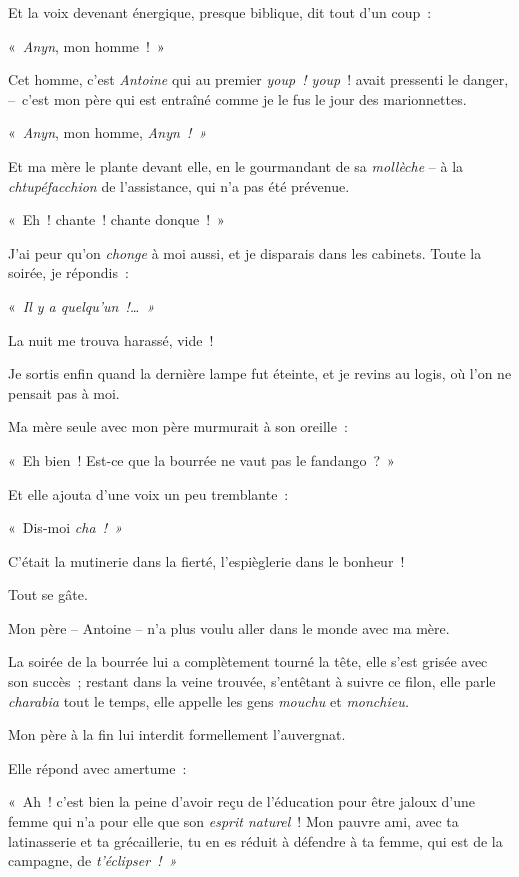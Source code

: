 \documentclass[french,twoside]{book} %
\begin{document}
\noindent Et la voix devenant énergique, presque biblique, dit tout d’un coup :\par
« \emph{Anyn}, mon homme ! »\par
Cet homme, c’est \emph{Antoine} qui au premier \emph{youp ! youp} ! avait pressenti le danger, – c’est mon père qui est entraîné comme je le fus le jour des marionnettes.\par
« \emph{Anyn}, mon homme, \emph{Anyn ! »}\par
Et ma mère le plante devant elle, en le gourmandant de sa \emph{mollèche} – à la \emph{chtupéfacchion} de l’assistance, qui n’a pas été prévenue.\par
« Eh ! chante ! chante donque ! »\par
J’ai peur qu’on \emph{chonge} à moi aussi, et je disparais dans les cabinets. Toute la soirée, je répondis :\par
« \emph{Il y a quelqu’un !… »}\par
La nuit me trouva harassé, vide !\par
Je sortis enfin quand la dernière lampe fut éteinte, et je revins au logis, où l’on ne pensait pas à moi.\par
Ma mère seule avec mon père murmurait à son oreille :\par
« Eh bien ! Est-ce que la bourrée ne vaut pas le fandango ? »\par
Et elle ajouta d’une voix un peu tremblante :\par
« Dis-moi \emph{cha ! »}\par
C’était la mutinerie dans la fierté, l’espièglerie dans le bonheur !\par
\bigbreak
\noindent Tout se gâte.\par
Mon père – Antoine – n’a plus voulu aller dans le monde avec ma mère.\par
La soirée de la bourrée lui a complètement tourné la tête, elle s’est grisée avec son succès ; restant dans la veine trouvée, s’entêtant à suivre ce filon, elle parle\emph{ charabia} tout le temps, elle appelle les gens\emph{ mouchu} et\emph{ monchieu.}\par
Mon père à la fin lui interdit formellement l’auvergnat.\par
Elle répond avec amertume :\par
« Ah ! c’est bien la peine d’avoir reçu de l’éducation pour être jaloux d’une femme qui n’a pour elle que son \emph{esprit naturel} ! Mon pauvre ami, avec ta latinasserie et ta grécaillerie, tu en es réduit à défendre à ta femme, qui est de la campagne, de\emph{ t’éclipser ! »}\par
\end{document}
